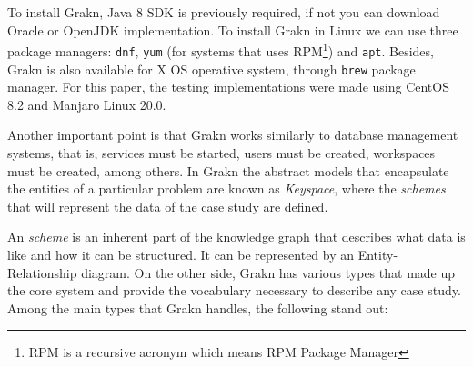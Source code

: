 To install Grakn, Java 8 SDK is previously required, if not you can download Oracle or OpenJDK implementation. To install Grakn in Linux we can use three package managers: \texttt{dnf}, \texttt{yum} (for systems that uses RPM\footnote{RPM is a recursive acronym which means RPM Package Manager}) and \texttt{apt}.
Besides, Grakn is also available for X OS operative system,  through \texttt{brew} package manager. For this paper, the testing implementations were made using CentOS 8.2 and Manjaro Linux 20.0.

Another important point is that Grakn works similarly to database management systems, that is, services must be started, users must be created, workspaces must be created, among others. In Grakn the abstract models that encapsulate the entities of a particular problem are known as \textit{Keyspace}, where the \textit{schemes} that will represent the data of the case study are defined.

An \textit{scheme} is an inherent part of the knowledge graph that describes what data is like and how it can be structured. It can be represented by an Entity-Relationship diagram. On the other side, Grakn has various types that made up the core system and provide the vocabulary necessary to describe any case study. Among the main types that Grakn handles, the following stand out:

